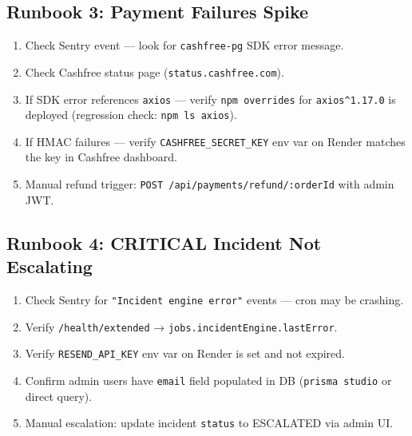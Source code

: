 \documentclass[12pt,a4paper]{article}
\begin{document}
\subsection{Runbook 3: Payment Failures Spike}

\begin{tcolorbox}[colback=warn!8,colframe=warn,title=\textbf{Trigger: Sentry alert — 5xx on /api/payments}]
\begin{enumerate}[leftmargin=*,nosep]
  \item Check Sentry event — look for \texttt{cashfree-pg} SDK error message.
  \item Check Cashfree status page (\texttt{status.cashfree.com}).
  \item If SDK error references \texttt{axios} — verify \texttt{npm overrides} for
        \texttt{axios\^{}1.17.0} is deployed (regression check: \texttt{npm ls axios}).
  \item If HMAC failures — verify \texttt{CASHFREE\_SECRET\_KEY} env var on Render
        matches the key in Cashfree dashboard.
  \item Manual refund trigger: \texttt{POST /api/payments/refund/:orderId} with admin JWT.
\end{enumerate}
\end{tcolorbox}

\subsection{Runbook 4: CRITICAL Incident Not Escalating}

\begin{tcolorbox}[colback=crit!5,colframe=crit,title=\textbf{Trigger: Ops team sees CRITICAL incident with no email}]
\begin{enumerate}[leftmargin=*,nosep]
  \item Check Sentry for \texttt{"Incident engine error"} events — cron may be crashing.
  \item Verify \texttt{/health/extended} → \texttt{jobs.incidentEngine.lastError}.
  \item Verify \texttt{RESEND\_API\_KEY} env var on Render is set and not expired.
  \item Confirm admin users have \texttt{email} field populated in DB
        (\texttt{prisma studio} or direct query).
  \item Manual escalation: update incident \texttt{status} to ESCALATED via admin UI.
\end{enumerate}
\end{tcolorbox}
\end{document}

